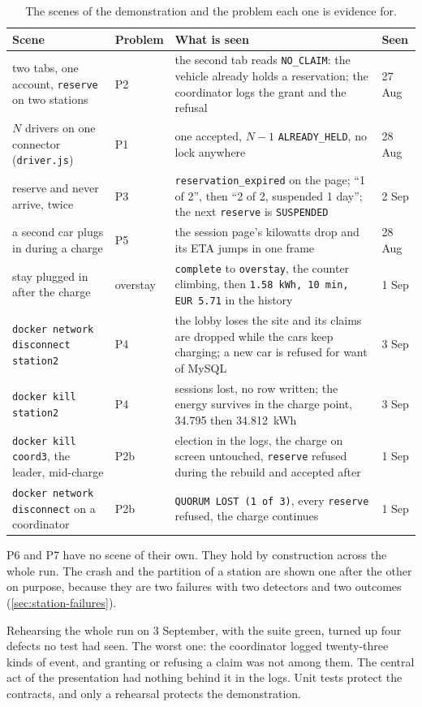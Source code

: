 \begin{table}[h]
\centering\small
\renewcommand{\arraystretch}{1.15}
\caption{The scenes of the demonstration and the problem each one is evidence for.}
\label{tab:demo}
\begin{tabularx}{\textwidth}{@{}>{\raggedright\arraybackslash}p{3.6cm} l X l@{}}
\toprule
Scene & Problem & What is seen & Seen \\
\midrule
two tabs, one account, \texttt{reserve} on two stations & P2 & the second tab reads
  \texttt{NO\_CLAIM}: the vehicle already holds a reservation; the coordinator logs the
  grant and the refusal & 27 Aug \\
$N$ drivers on one connector (\texttt{driver.js}) & P1 & one accepted, $N-1$
  \texttt{ALREADY\_HELD}, no lock anywhere & 28 Aug \\
reserve and never arrive, twice & P3 & \texttt{reservation\_expired} on the page; ``1 of
  2'', then ``2 of 2, suspended 1 day''; the next \texttt{reserve} is \texttt{SUSPENDED} &
  2 Sep \\
a second car plugs in during a charge & P5 & the session page's kilowatts drop and its ETA
  jumps in one frame & 28 Aug \\
stay plugged in after the charge & overstay & \texttt{complete} to \texttt{overstay},
  the counter climbing, then \texttt{1.58~kWh, 10~min, EUR~5.71} in the history & 1 Sep \\
\texttt{docker network disconnect station2} & P4 & the lobby loses the site and its claims
  are dropped while the cars keep charging; a new car is refused for want of MySQL &
  3 Sep \\
\texttt{docker kill station2} & P4 & sessions lost, no row written; the energy survives in
  the charge point, 34.795 then 34.812~kWh & 3 Sep \\
\texttt{docker kill coord3}, the leader, mid-charge & P2b & election in the logs, the charge
  on screen untouched, \texttt{reserve} refused during the rebuild and accepted after &
  1 Sep \\
\texttt{docker network disconnect} on a coordinator & P2b & \texttt{QUORUM LOST (1 of 3)},
  every \texttt{reserve} refused, the charge continues & 1 Sep \\
\bottomrule
\end{tabularx}
\end{table}

P6 and P7 have no scene of their own. They hold by construction across the whole run. The
crash and the partition of a station are shown one after the other on purpose, because they
are two failures with two detectors and two outcomes (\cref{sec:station-failures}).

Rehearsing the whole run on 3 September, with the suite green, turned up four defects no
test had seen. The worst one: the coordinator logged twenty-three kinds of event, and
granting or refusing a claim was not among them. The central act of the presentation had
nothing behind it in the logs. Unit tests protect the contracts, and only a rehearsal
protects the demonstration.

